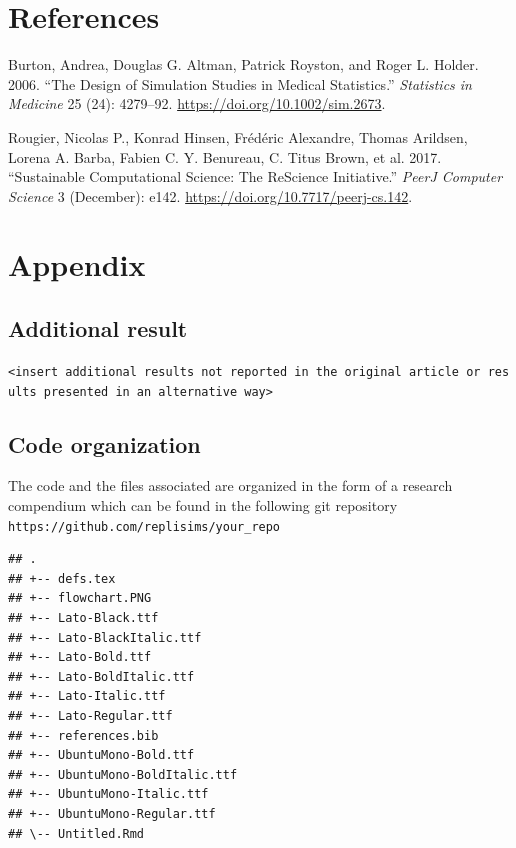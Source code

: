 \documentclass[10,a4paperpaper,]{article}
\newenvironment{CSLReferences}%
  {}%
  {\par}
\begin{document}
\newpage

\section*{References}
\begingroup
\hphantom{x}
\setlength{\parindent}{-0.5in}
\setlength{\leftskip}{0.5in}

\hypertarget{refs}{}
\begin{CSLReferences}{1}{0}
\leavevmode\hypertarget{ref-burton_design_2006}{}%
Burton, Andrea, Douglas G. Altman, Patrick Royston, and Roger L. Holder.
2006. {``The Design of Simulation Studies in Medical Statistics.''}
\emph{Statistics in Medicine} 25 (24): 4279--92.
\url{https://doi.org/10.1002/sim.2673}.

\leavevmode\hypertarget{ref-rougier_sustainable_2017-1}{}%
Rougier, Nicolas P., Konrad Hinsen, Frédéric Alexandre, Thomas Arildsen,
Lorena A. Barba, Fabien C. Y. Benureau, C. Titus Brown, et al. 2017.
{``Sustainable Computational Science: The {ReScience} Initiative.''}
\emph{PeerJ Computer Science} 3 (December): e142.
\url{https://doi.org/10.7717/peerj-cs.142}.

\end{CSLReferences}

\FloatBarrier
\endgroup
\newpage

\section*{Appendix}

\subsection*{Additional result}

\texttt{\textless{}insert\ additional\ results\ not\ reported\ in\ the\ original\ article\ or\ results\ presented\ in\ an\ alternative\ way\textgreater{}}

\subsection{Code organization}

The code and the files associated are organized in the form of a
research compendium which can be found in the following git repository
\texttt{https://github.com/replisims/your\_repo}

\begin{verbatim}
## .
## +-- defs.tex
## +-- flowchart.PNG
## +-- Lato-Black.ttf
## +-- Lato-BlackItalic.ttf
## +-- Lato-Bold.ttf
## +-- Lato-BoldItalic.ttf
## +-- Lato-Italic.ttf
## +-- Lato-Regular.ttf
## +-- references.bib
## +-- UbuntuMono-Bold.ttf
## +-- UbuntuMono-BoldItalic.ttf
## +-- UbuntuMono-Italic.ttf
## +-- UbuntuMono-Regular.ttf
## \-- Untitled.Rmd
\end{verbatim}
\end{document}
